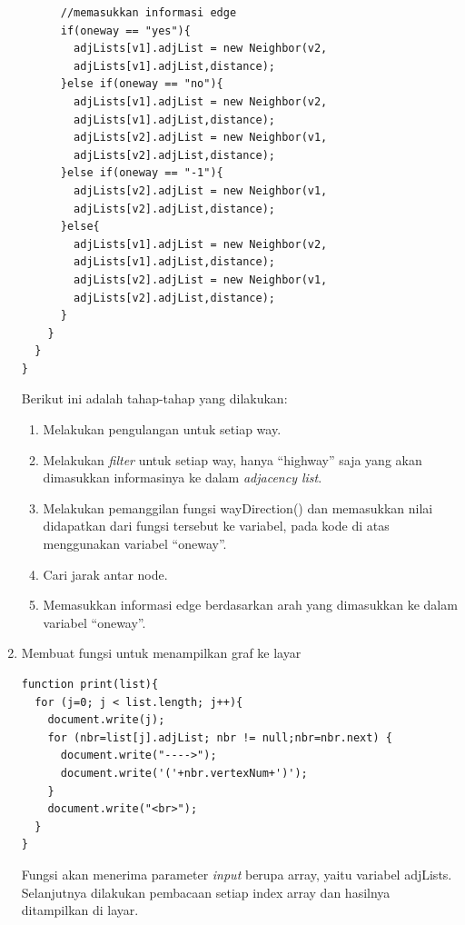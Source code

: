 \begin{enumerate}
\begin{verbatim}
      //memasukkan informasi edge		
      if(oneway == "yes"){
        adjLists[v1].adjList = new Neighbor(v2,
        adjLists[v1].adjList,distance); 
      }else if(oneway == "no"){
        adjLists[v1].adjList = new Neighbor(v2,
        adjLists[v1].adjList,distance); 
        adjLists[v2].adjList = new Neighbor(v1,
        adjLists[v2].adjList,distance);
      }else if(oneway == "-1"){
        adjLists[v2].adjList = new Neighbor(v1,
        adjLists[v2].adjList,distance); 
      }else{
        adjLists[v1].adjList = new Neighbor(v2,
        adjLists[v1].adjList,distance); 
        adjLists[v2].adjList = new Neighbor(v1,
        adjLists[v2].adjList,distance); 
      }	
    }
  }
}
\end{verbatim}
  Berikut ini adalah tahap-tahap yang dilakukan:
  \begin{enumerate}
    \item Melakukan pengulangan untuk setiap way.
    
    \item Melakukan \textit{filter} untuk setiap way, hanya ``highway'' saja
    yang akan dimasukkan informasinya ke dalam \textit{adjacency list}.
    
    \item Melakukan pemanggilan fungsi wayDirection() dan memasukkan nilai
    didapatkan dari fungsi tersebut ke variabel, pada kode di atas menggunakan
    variabel ``oneway''.
    
    \item Cari jarak antar node.
    
    \item Memasukkan informasi edge berdasarkan arah yang dimasukkan ke dalam
    variabel ``oneway''.
  \end{enumerate}

  \item Membuat fungsi untuk menampilkan graf ke layar
\begin{verbatim}
function print(list){
  for (j=0; j < list.length; j++){
    document.write(j);
    for (nbr=list[j].adjList; nbr != null;nbr=nbr.next) {
      document.write("---->");
      document.write('('+nbr.vertexNum+')');
    }
    document.write("<br>");
  }
}
\end{verbatim}
  Fungsi akan menerima parameter \textit{input} berupa array, yaitu
  variabel adjLists. Selanjutnya dilakukan pembacaan setiap index array dan
  hasilnya ditampilkan di layar.
\end{enumerate}
